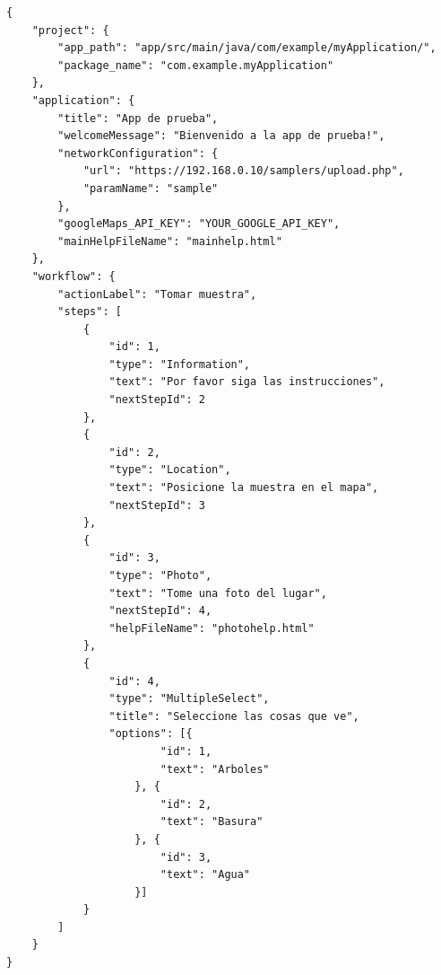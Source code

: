 \begin{lstlisting}[language=XML, frame=tlbr, label={codigo:app_ejemplo}, caption=Ejemplo de un archivo de configuración para Samplers.]
{
	"project": {
		"app_path": "app/src/main/java/com/example/myApplication/",
		"package_name": "com.example.myApplication"
	},
	"application": {
		"title": "App de prueba",
		"welcomeMessage": "Bienvenido a la app de prueba!",
		"networkConfiguration": {
			"url": "https://192.168.0.10/samplers/upload.php",
			"paramName": "sample"
		},
		"googleMaps_API_KEY": "YOUR_GOOGLE_API_KEY",
		"mainHelpFileName": "mainhelp.html"
	},
	"workflow": {
		"actionLabel": "Tomar muestra",
		"steps": [
			{
				"id": 1,
				"type": "Information",
				"text": "Por favor siga las instrucciones",
				"nextStepId": 2
			}, 
			{
				"id": 2,
				"type": "Location",
				"text": "Posicione la muestra en el mapa",
				"nextStepId": 3
			}, 
			{
				"id": 3,
				"type": "Photo",
				"text": "Tome una foto del lugar",
				"nextStepId": 4,
				"helpFileName": "photohelp.html"
			},
			{
				"id": 4,
				"type": "MultipleSelect",
				"title": "Seleccione las cosas que ve",
				"options": [{
						"id": 1,
						"text": "Arboles"
					}, {
						"id": 2,
						"text": "Basura"
					}, {
						"id": 3,
						"text": "Agua"
					}]
			}
		]
	}
}
\end{lstlisting}

